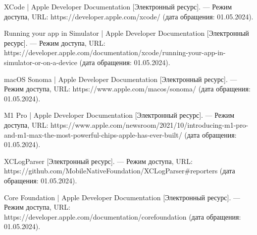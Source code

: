 \begin{thebibliography}{}
	XCode | Apple Developer Documentation  [Электронный ресурс]. --- Режим доступа, URL: https://developer.apple.com/xcode/ (дата обращения: 01.05.2024).
	
	Running your app in Simulator | Apple Developer Documentation  [Электронный ресурс]. --- Режим доступа, URL: https://developer.apple.com/documentation/xcode/running-your-app-in-simulator-or-on-a-device (дата обращения: 01.05.2024).

    macOS Sonoma | Apple Developer Documentation [Электронный ресурс]. --- Режим доступа, URL: https://www.apple.com/macos/sonoma/ (дата обращения: 01.05.2024).

    M1 Pro | Apple Developer Documentation  [Электронный ресурс]. --- Режим доступа, URL: https://www.apple.com/newsroom/2021/10/introducing-m1-pro-and-m1-max-the-most-powerful-chips-apple-has-ever-built/ (дата обращения: 01.05.2024).

    
	XCLogParser [Электронный ресурс]. --- Режим доступа, URL: https://github.com/MobileNativeFoundation/XCLogParser#reporters (дата обращения: 01.05.2024).
	
	Core Foundation | Apple Developer Documentation [Электронный ресурс]. --- Режим доступа, URL: https://developer.apple.com/documentation/corefoundation (дата обращения: 01.05.2024).


\end{thebibliography}
\endgroup

\pagebreak